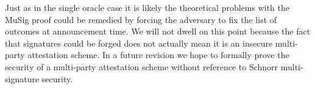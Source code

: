 \documentclass[runningheads]{llncs}
\begin{document}
Just as in the single oracle case it is likely the theoretical problems with the MuSig proof could be remedied by forcing the adversary to fix the list of outcomes at announcement time.
We will not dwell on this point because the fact that signatures could be forged does not actually mean it is an insecure multi-party attestation scheme.
In a future revision we hope to formally prove the security of a multi-party attestation scheme without reference to Schnorr multi-signature security.

{}

\end{document}

